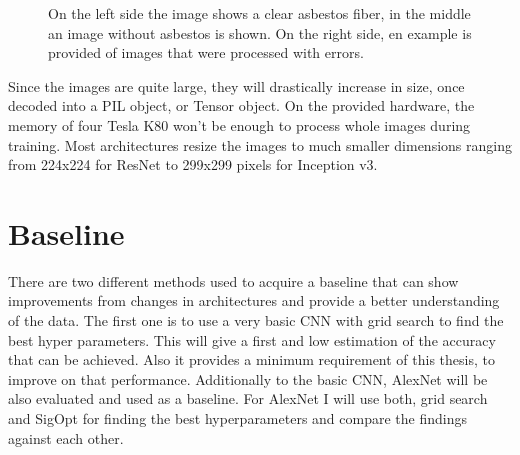 \begin{figure}[t]
\centering
{}
\caption{On the left side the image shows a clear asbestos fiber, in the middle an image without asbestos is shown. On the right side, en example is provided of images that were processed with errors.}
\label{fig:basic_examples}
\end{figure}

\newpage

Since the images are quite large, they will drastically increase in size, once decoded into a PIL object, or Tensor object. On the provided hardware, the memory of four Tesla K80 won't be enough to process whole images during training. Most architectures resize the images to much smaller dimensions ranging from 224x224 for ResNet to 299x299 pixels for Inception v3.

\section{Baseline}

There are two different methods used to acquire a baseline that can show improvements from changes in architectures and provide a better understanding of the data. The first one is to use a very basic CNN with grid search to find the best hyper parameters. This will give a first and low estimation of the accuracy that can be achieved. Also it provides a minimum requirement of this thesis, to improve on that performance. Additionally to the basic CNN, AlexNet will be also evaluated and used as a baseline. For AlexNet I will use both, grid search and SigOpt for finding the best hyperparameters and compare the findings against each other.\\

